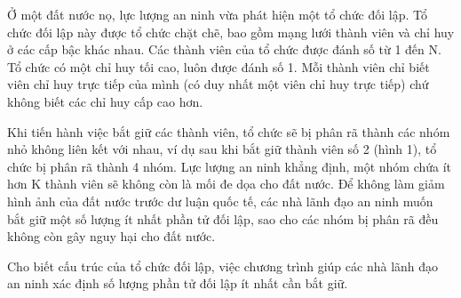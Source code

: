 Ở một đất nước nọ, lực lượng an ninh vừa phát hiện một tổ chức đối lập. Tổ chức đối lập này được tổ chức chặt chẽ, bao gồm mạng lưới thành viên và chỉ huy ở các cấp bậc khác nhau. Các thành viên của tổ chức được đánh số từ 1 đến N. Tổ chức có một chỉ huy tối cao, luôn được đánh số 1. Mỗi thành viên chỉ biết viên chỉ huy trực tiếp của mình (có duy nhất một viên chỉ huy trực tiếp) chứ không biết các chỉ huy cấp cao hơn.

Khi tiến hành việc bắt giữ các thành viên, tổ chức sẽ bị phân rã thành các nhóm nhỏ không liên kết với nhau, ví dụ sau khi bắt giữ thành viên số 2 (hình 1), tổ chức bị phân rã thành 4 nhóm. Lực lượng an ninh khẳng định, một nhóm chứa ít hơn K thành viên sẽ không còn là mối đe dọa cho đất nước. Để không làm giảm hình ảnh của đất nước trước dư luận quốc tế, các nhà lãnh đạo an ninh muốn bắt giữ một số lượng ít nhất phần tử đối lập, sao cho các nhóm bị phân rã đều không còn gây nguy hại cho đất nước.

Cho biết cấu trúc của tổ chức đối lập, việc chương trình giúp các nhà lãnh đạo an ninh xác định số lượng phần tử đối lập ít nhất cần bắt giữ.